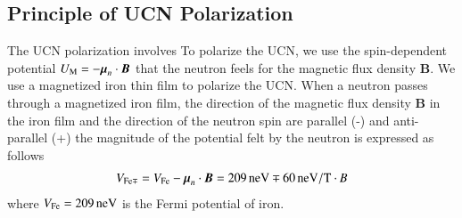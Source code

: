 \documentclass{jps-cp}
\begin{document}

\subsection{Principle of UCN Polarization}
The UCN polarization involves
To polarize the UCN, we use the spin-dependent potential $U_{\rm M}=-\boldsymbol \mu_n\cdot {\boldsymbol B}$ that the neutron feels for the magnetic flux density $\boldsymbol B$.
We use a magnetized iron thin film to polarize the UCN. When a neutron passes through a magnetized iron film, the direction of the magnetic flux density $\boldsymbol {B}$ in the iron film and the direction of the neutron spin are parallel (-) and
anti-parallel (+)
the magnitude of the potential felt by the neutron is expressed as follows
\begin {align}
V_{\rm Fe \mp}=V_{\rm Fe}-{\boldsymbol\mu_n}\cdot {\boldsymbol {B}}=209\,\rm neV \mp 60\,\rm neV/T \cdot{\it B}
\label{Vp,Vap}
\end{align}
where $V_{\rm Fe}=209\,\rm neV$ is the Fermi potential of iron.
\end{document}
